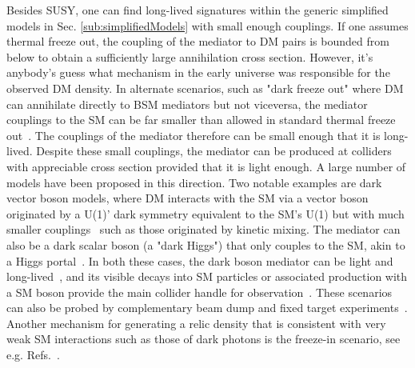 Besides SUSY, one can find long-lived signatures within the generic simplified models in Sec. \ref{sub:simplifiedModels} with small enough couplings. If one assumes thermal freeze out, the coupling of the mediator to DM pairs is bounded from below to obtain a sufficiently large annihilation cross section. However, it's anybody's guess what mechanism in the early universe was responsible for the observed DM density. In alternate scenarios, such as "dark freeze out" where DM can annihilate directly to BSM mediators but not viceversa, the mediator couplings to the SM can be far smaller than allowed in standard thermal freeze out~\cite{Pospelov:2007mp,Das:2010ts}. The couplings of the mediator therefore can be small enough that it is long-lived. Despite these small couplings, the mediator can be produced at colliders with appreciable cross section provided that it is light enough. A large number of models have been proposed in this direction. Two notable examples are dark vector boson models, where DM interacts with the SM via a vector boson originated by a U(1)' dark symmetry equivalent to the SM's U(1) but with much smaller couplings~\cite{Holdom:1985ag} such as those originated by kinetic mixing. 
The mediator can also be a dark scalar boson (a "dark Higgs") that only couples to the SM, akin to a Higgs portal~\cite{Curtin:2014cca}. %
In both these cases, the dark boson mediator can be light and long-lived~\cite{Pospelov:2007mp}, and its visible decays into SM particles or associated production with a SM boson provide the main collider handle for observation~\cite{Curtin:2014cca}. These scenarios can also be probed by complementary beam dump and fixed target experiments~\cite{Battaglieri:2017aum}. %
Another mechanism for generating a relic density that is consistent with very weak SM interactions such as those of dark photons is the freeze-in scenario, see e.g. Refs.~\cite{Co:2015pka,Bernal:2017kxu}. 

